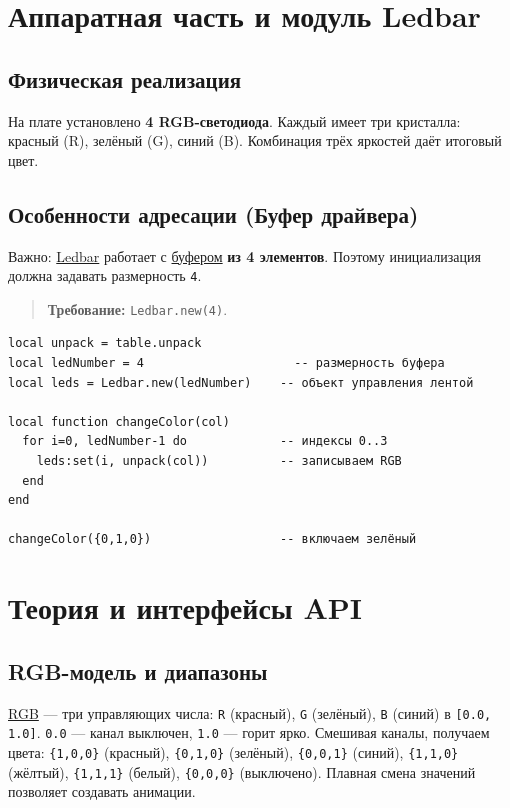 \documentclass[a4paper,12pt]{article}
\begin{document}
\section{Аппаратная часть и модуль Ledbar}
\subsection{Физическая реализация}
На плате установлено \textbf{4 RGB-светодиода}. Каждый имеет три кристалла: красный (R), зелёный (G), синий (B). Комбинация трёх яркостей даёт итоговый цвет.

\subsection{Особенности адресации (Буфер драйвера)}
Важно: \hyperlink{term:ledbar}{Ledbar} работает с \hyperlink{term:buffer}{буфером} \textbf{из 4 элементов}. Поэтому инициализация должна задавать размерность \verb|4|.
\begin{quote}
\textbf{Требование:} \verb|Ledbar.new(4)|.
\end{quote}
\begin{lstlisting}[style=lua,caption={Инициализация и установка зелёного цвета}]
local unpack = table.unpack
local ledNumber = 4                     -- размерность буфера
local leds = Ledbar.new(ledNumber)    -- объект управления лентой

local function changeColor(col)
  for i=0, ledNumber-1 do             -- индексы 0..3
    leds:set(i, unpack(col))          -- записываем RGB
  end
end

changeColor({0,1,0})                  -- включаем зелёный
\end{lstlisting}

\section{Теория и интерфейсы API}
\subsection{RGB-модель и диапазоны}
\hyperlink{term:rgb}{RGB} — три управляющих числа: \verb|R| (красный), \verb|G| (зелёный), \verb|B| (синий) в \verb|[0.0, 1.0]|. \verb|0.0| — канал выключен, \verb|1.0| — горит ярко. Смешивая каналы, получаем цвета: \verb|{1,0,0}| (красный), \verb|{0,1,0}| (зелёный), \verb|{0,0,1}| (синий), \verb|{1,1,0}| (жёлтый), \verb|{1,1,1}| (белый), \verb|{0,0,0}| (выключено). Плавная смена значений позволяет создавать анимации.
\end{document}
